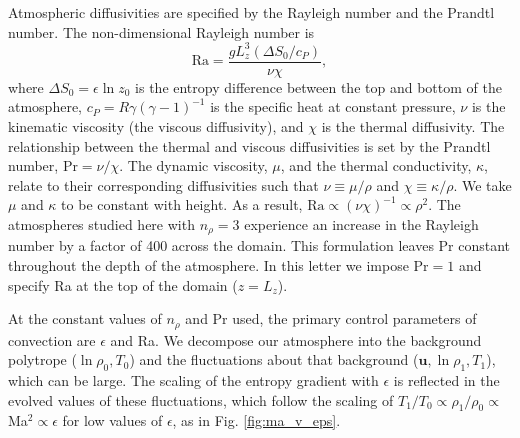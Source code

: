 \documentclass[aps, prl, twocolumn, nofootinbib, groupedaddress, amsfonts, amssymb, amsmath]{revtex4-1}
\begin{document}
Atmospheric diffusivities are specified by the Rayleigh number
and the Prandtl number.  The
non-dimensional Rayleigh number is
\begin{equation}
\text{Ra} = \frac{g L_z^3 (\Delta S_0 / c_P)}{\nu\chi},
\end{equation}
where $\Delta S_0 = \epsilon\ln z_0$ is the entropy difference 
between the top and bottom of the atmosphere, 
$c_P = R\gamma(\gamma-1)^{-1}$ is the specific heat 
at constant pressure, $\nu$ is the kinematic viscosity 
(the viscous diffusivity), and $\chi$ is the thermal diffusivity.  
The relationship between the thermal and viscous diffusivities is
set by the Prandtl number, $\text{Pr} = \nu/\chi$.   
The dynamic viscosity, $\mu$, and the thermal conductivity,
$\kappa$, relate to their corresponding diffusivities such that 
$\nu \equiv \mu/\rho$ and $\chi \equiv \kappa/\rho$.  We take
$\mu$ and $\kappa$ to be constant with height.
As a result, $\text{Ra} \propto (\nu\chi)^{-1} \propto
\rho^2$.  The atmospheres studied here with $n_{\rho} = 3$ 
experience an increase in the Rayleigh number 
by a factor of 400 across the domain.  This formulation leaves Pr
constant throughout the depth of the atmosphere. 
In this letter we impose $\text{Pr} = 1$ and specify Ra at 
the top of the domain ($z = L_z$). 

At the constant values of $n_\rho$ and Pr used, 
the primary control parameters of convection are $\epsilon$
and Ra.  We decompose our atmosphere into the background 
polytrope ($\ln\rho_{0}, T_{0}$) and the fluctuations
about that background ($\bm{u}, \ln\rho_{1}, T_{1}$),
which can be large.
The scaling of the entropy gradient with $\epsilon$
is reflected in the evolved values of these fluctuations, 
which follow the scaling of
$T_1/T_0 \propto \rho_{1}/\rho_{0} \propto$ Ma$^{2} \propto \epsilon$ 
for low values of $\epsilon$,
as in Fig. \ref{fig:ma_v_eps}.  
\end{document}
